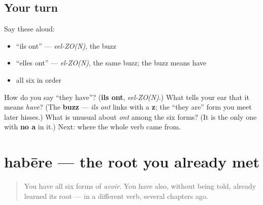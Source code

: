\subsection*{Your turn}
Say these aloud:

\begin{itemize}
\raggedright
  \item \textquotedblleft{}ils ont\textquotedblright{} — \emph{eel-ZO(N)}, the buzz
  \item \textquotedblleft{}elles ont\textquotedblright{} — \emph{el-ZO(N)}, the same buzz; the buzz means have
  \item all six in order
\end{itemize}

\begin{tcolorbox}[breakable,colback=teal!4,colframe=teal!35!black,title={Before you move on}]
How do you say \textquotedblleft{}they have\textquotedblright{}? (\textbf{ils ont}, \emph{eel-ZO(N)}.) What tells your ear that it means \emph{have}? (The \textbf{buzz} — \emph{ils ont} links with a \textbf{z}; the \textquotedblleft{}they are\textquotedblright{} form you meet later hisses.) What is unusual about \emph{ont} among the six forms? (It is the only one with \textbf{no a} in it.) Next: where the whole verb came from.
\end{tcolorbox}
\section[habēre]{habēre — the root you already met}

\label{lesson:FR-C14-habere}



\begin{quote}
You have all six forms of \emph{avoir}. You have also, without being told, already learned its root — in a different verb, several chapters ago.
\end{quote}

